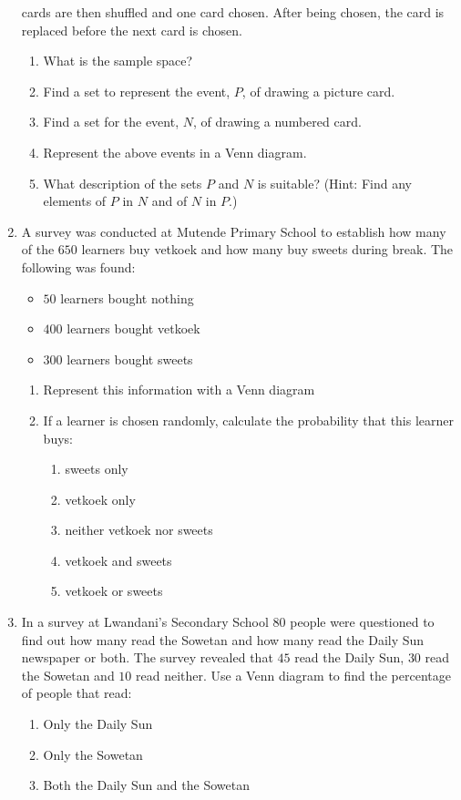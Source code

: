 \begin{eocexercises}{}
\begin{enumerate}[itemsep=5pt, label=\textbf{\arabic*}. ]
    cards are then shuffled and one card chosen. After being chosen,
    the card is replaced before the next card is chosen.
    \begin{enumerate}[noitemsep, label=\textbf{(\alph*)} ]
    \item What is the sample space?
    \item Find a set to represent the event, $P$, of drawing a picture
      card.
    \item Find a set for the event, $N$, of drawing a numbered card.
    \item Represent the above events in a Venn diagram.
    \item What description of the sets $P$ and $N$ is suitable?
      (Hint: Find any elements of $P$ in $N$ and of $N$ in $P$.)
    \end{enumerate}
\item A survey was conducted at Mutende Primary School to establish how many of the $650$ learners buy vetkoek and how many buy sweets during break. The following was found:
\begin{itemize}
 \item $50$ learners bought nothing
\item $400$ learners bought vetkoek
\item $300$ learners bought sweets
\end{itemize}
\begin{enumerate}[noitemsep, label=\textbf{(\alph*)} ]
 \item Represent this information with a Venn diagram
\item If a learner is chosen randomly, calculate the probability that this learner buys:
\begin{enumerate}
\item sweets only
\item vetkoek only
\item neither vetkoek nor sweets
\item vetkoek and sweets
\item vetkoek or sweets
\end{enumerate}
\end{enumerate}
\item In a survey at Lwandani's Secondary School $80$ people were questioned to find out how many read the Sowetan and how many read the Daily Sun newspaper or both. The survey revealed that $45$ read the Daily Sun, $30$ read the Sowetan and $10$ read neither. Use a Venn diagram to find the percentage of people that read:
\begin{enumerate}[noitemsep, label=\textbf{(\alph*)} ]
 \item Only the Daily Sun
\item Only the Sowetan
\item Both the Daily Sun and the Sowetan
\end{enumerate}


\end{enumerate}
\end{eocexercises}
